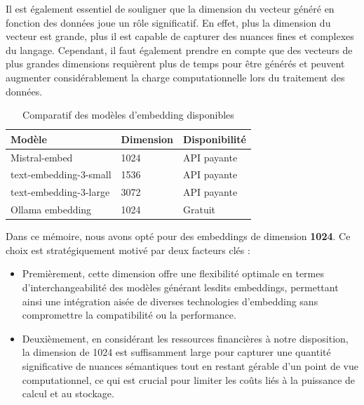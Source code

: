 Il est également essentiel de souligner que la dimension du vecteur généré en fonction des données joue un rôle significatif. En effet, plus la dimension du vecteur est grande, plus il est capable de capturer des nuances fines et complexes du langage. Cependant, il faut également prendre en compte que des vecteurs de plus grandes dimensions requièrent plus de temps pour être générés et peuvent augmenter considérablement la charge computationnelle lors du traitement des données.

\newpage

\begin{table}[h]
\centering
\begin{tabular}{|p{7cm}|p{3cm}|p{3cm}|}
\hline
\textbf{Modèle}            & \textbf{Dimension} & \textbf{Disponibilité} \\ \hline
Mistral-embed              & 1024               & API payante            \\ \hline
text-embedding-3-small     & 1536               & API payante            \\ \hline
text-embedding-3-large     & 3072               & API payante            \\ \hline
Ollama embedding           & 1024               & Gratuit     \\ \hline
\end{tabular}

\caption{Comparatif des modèles d'embedding disponibles}
\label{table:embedding_models}
\end{table}


Dans ce mémoire, nous avons opté pour des embeddings de dimension \textbf{1024}. Ce choix est stratégiquement motivé par deux facteurs clés : 
\begin{itemize}
    \item Premièrement, cette dimension offre une flexibilité optimale en termes d'interchangeabilité des modèles générant lesdits embeddings, permettant ainsi une intégration aisée de diverses technologies d'embedding sans compromettre la compatibilité ou la performance.

    \item Deuxièmement, en considérant les ressources financières à notre disposition, la dimension de 1024 est suffisamment large pour capturer une quantité significative de nuances sémantiques tout en restant gérable d'un point de vue computationnel, ce qui est crucial pour limiter les coûts liés à la puissance de calcul et au stockage.
\end{itemize}

